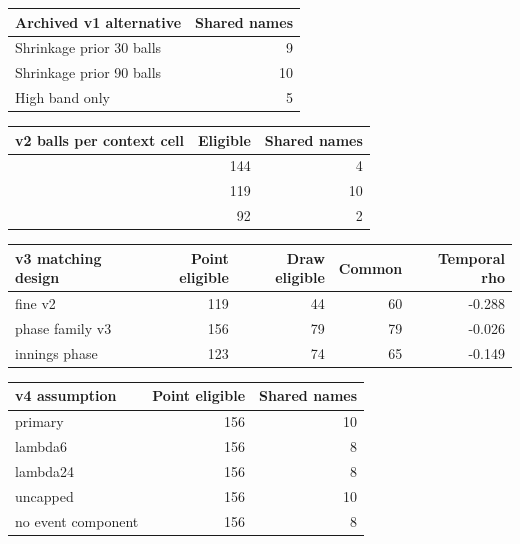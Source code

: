 \begin{center}
\begin{tabularx}{\linewidth}{>{\raggedright\arraybackslash}Xr}
\toprule
Archived v1 alternative & Shared names \\
\midrule
Shrinkage prior 30 balls & 9 \\
Shrinkage prior 90 balls & 10 \\
High band only & 5 \\
\bottomrule
\end{tabularx}
\end{center}

\begin{center}
\begin{tabularx}{\linewidth}{>{\raggedright\arraybackslash}Xrr}
\toprule
v2 balls per context cell & Eligible & Shared names \\
\midrule
6 & 144 & 4 \\
12 & 119 & 10 \\
24 & 92 & 2 \\
\bottomrule
\end{tabularx}
\end{center}

\begin{center}
\begin{tabularx}{\linewidth}{>{\raggedright\arraybackslash}Xrrrr}
\toprule
v3 matching design & Point eligible & Draw eligible & Common & Temporal rho \\
\midrule
fine v2 & 119 & 44 & 60 & -0.288 \\
phase family v3 & 156 & 79 & 79 & -0.026 \\
innings phase & 123 & 74 & 65 & -0.149 \\
\bottomrule
\end{tabularx}
\end{center}

\begin{center}
\begin{tabularx}{\linewidth}{>{\raggedright\arraybackslash}Xrr}
\toprule
v4 assumption & Point eligible & Shared names \\
\midrule
primary & 156 & 10 \\
lambda6 & 156 & 8 \\
lambda24 & 156 & 8 \\
uncapped & 156 & 10 \\
no event component & 156 & 8 \\
\bottomrule
\end{tabularx}
\end{center}

